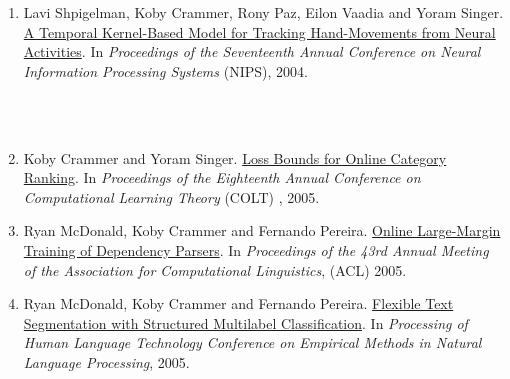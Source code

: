 \documentclass{resume}
\newcommand{\upenn}{~Position at UPENN~}
\begin{document}
\begin{enumerate}
\item Lavi Shpigelman, {Koby Crammer}, Rony Paz, Eilon Vaadia and Yoram Singer.
\href{http://www.cis.upenn.edu/~crammer/publications/ddt-nips04.pdf}{A Temporal Kernel-Based Model for Tracking Hand-Movements from Neural Activities}.
In {\em Proceedings of the Seventeenth Annual Conference on Neural Information Processing Systems} (NIPS), 2004.
\\~\\\centerline{\hrulefill\raisebox{-0.5\ht2}{\upenn}\hrulefill}\\

\item {Koby Crammer} and Yoram Singer.
\href{http://www.cis.upenn.edu/~crammer/publications/colt05.pdf}{Loss Bounds for Online Category Ranking}.
In {\em Proceedings of the Eighteenth Annual Conference on Computational Learning Theory} (COLT) , 2005.

\item Ryan McDonald, {Koby Crammer} and Fernando Pereira.
\href{http://www.cis.upenn.edu/~crammer/publications/dependencyACL2005.pdf}{Online Large-Margin Training of Dependency Parsers}.
In {\em Proceedings of the 43rd Annual Meeting of the Association for Computational Linguistics}, (ACL) 2005.

\item Ryan McDonald, {Koby Crammer} and Fernando Pereira.
\href{http://www.cis.upenn.edu/~crammer/publications/segmentationHLT-EMNLP2005.pdf}{Flexible Text Segmentation with Structured Multilabel Classification}.
In {\em Processing of Human Language Technology Conference on Empirical Methods in Natural Language Processing}, 2005.


\end{enumerate}
\end{document}
